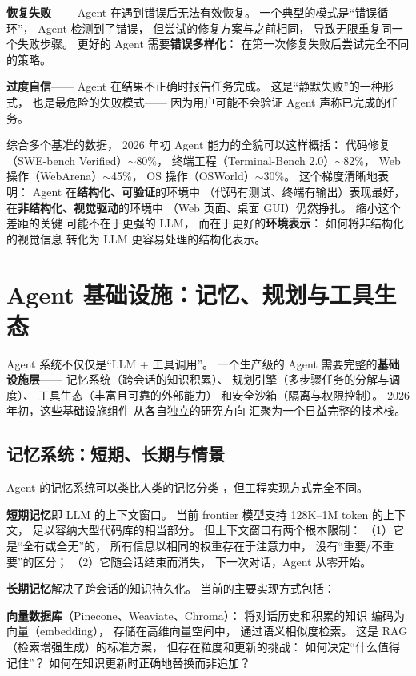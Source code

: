 \textbf{恢复失败}——
Agent 在遇到错误后无法有效恢复。
一个典型的模式是“错误循环”，
Agent 检测到了错误，
但尝试的修复方案与之前相同，
导致无限重复同一个失败步骤。
更好的 Agent 需要\textbf{错误多样化}：
在第一次修复失败后尝试完全不同的策略。

\textbf{过度自信}——
Agent 在结果不正确时报告任务完成。
这是“静默失败”的一种形式，
也是最危险的失败模式——
因为用户可能不会验证
Agent 声称已完成的任务。

\begin{keybox}[可靠性差距的量化]
综合多个基准的数据，
2026 年初 Agent 能力的全貌可以这样概括：
代码修复（SWE-bench Verified）$\sim$80\%，
终端工程（Terminal-Bench 2.0）$\sim$82\%，
Web 操作（WebArena）$\sim$45\%，
OS 操作（OSWorld）$\sim$30\%。
这个梯度清晰地表明：
Agent 在\textbf{结构化、可验证}的环境中
（代码有测试、终端有输出）表现最好，
在\textbf{非结构化、视觉驱动}的环境中
（Web 页面、桌面 GUI）仍然挣扎。
缩小这个差距的关键
可能不在于更强的 LLM，
而在于更好的\textbf{环境表示}：
如何将非结构化的视觉信息
转化为 LLM 更容易处理的结构化表示。
\end{keybox}


\section{Agent 基础设施：记忆、规划与工具生态}
\label{sec:agent-infrastructure}

Agent 系统不仅仅是“LLM + 工具调用”。
一个生产级的 Agent 需要完整的\textbf{基础设施层}——
记忆系统（跨会话的知识积累）、
规划引擎（多步骤任务的分解与调度）、
工具生态（丰富且可靠的外部能力）
和安全沙箱（隔离与权限控制）。
2026 年初，这些基础设施组件
从各自独立的研究方向
汇聚为一个日益完整的技术栈。

\subsection{记忆系统：短期、长期与情景}

Agent 的记忆系统可以类比人类的记忆分类
，但工程实现方式完全不同。

\textbf{短期记忆}即 LLM 的上下文窗口。
当前 frontier 模型支持 128K--1M token 的上下文，
足以容纳大型代码库的相当部分。
但上下文窗口有两个根本限制：
（1）它是“全有或全无”的，
所有信息以相同的权重存在于注意力中，
没有“重要/不重要”的区分；
（2）它随会话结束而消失，
下一次对话，Agent 从零开始。

\textbf{长期记忆}解决了跨会话的知识持久化。
当前的主要实现方式包括：

\textbf{向量数据库}（Pinecone、Weaviate、Chroma）：
将对话历史和积累的知识
编码为向量（embedding），
存储在高维向量空间中，
通过语义相似度检索。
这是 RAG（检索增强生成）的标准方案，
但存在粒度和更新的挑战：
如何决定“什么值得记住”？
如何在知识更新时正确地替换而非追加？

